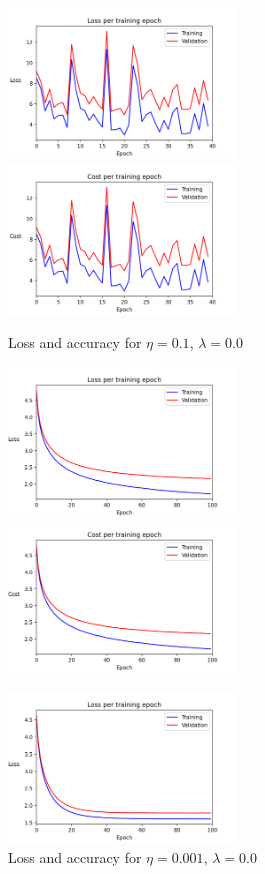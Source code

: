 \documentclass{article}
\begin{document}
	\begin{figure}[h!]
		\centering
		\includegraphics[width=6cm]{../plots/loss_v1.png}
		\includegraphics[width=6cm]{../plots/cost_v1.png}
		\caption{Loss and accuracy for $\eta=0.1$, $\lambda=0.0$}
		\vspace{0.2cm}
		\includegraphics[width=6cm]{../plots/loss_v2.png}
		\includegraphics[width=6cm]{../plots/cost_v2.png}
		\caption{Loss and accuracy for $\eta=0.001$, $\lambda=0.0$}
		\vspace{0.2cm}
		\includegraphics[width=6cm]{../plots/loss_v3.png}

\end{figure}
\end{document}
